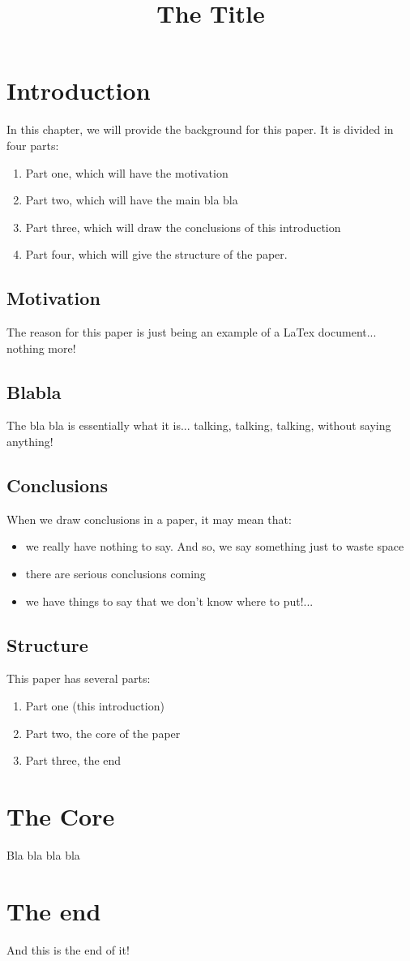 \documentclass{llncs}
\begin{document}
\title{The Title}
\chapter{Introduction}
In this chapter, we will provide the background for this paper. It
is divided in four parts:
\begin{enumerate}
\item Part one, which will have the motivation
\item Part two, which will have the main bla bla
\item Part three, which will draw the conclusions of this
introduction
\item Part four, which will give the structure of the paper.
\end{enumerate}
\section{Motivation}
The reason for this paper is just being an example of a LaTex
document... nothing more!\\
\section{Blabla}
The bla bla is essentially what it is... talking, talking,
talking, without saying anything!\\
\section{Conclusions}
When we draw conclusions in a paper, it may mean that:
\begin{itemize}
\item we really have nothing to say. And so, we say something just
to waste space
\item there are serious conclusions coming
\item we have things to say that we don't know where to put!...
\end{itemize}
\section{Structure}
This paper has several parts:
\begin{enumerate}
\item Part one (this introduction)
\item Part two, the core of the paper
\item Part three, the end
\end{enumerate}

\chapter{The Core}
Bla bla bla bla\\
\chapter{The end}
And this is the end of it!\\
\end{document}
